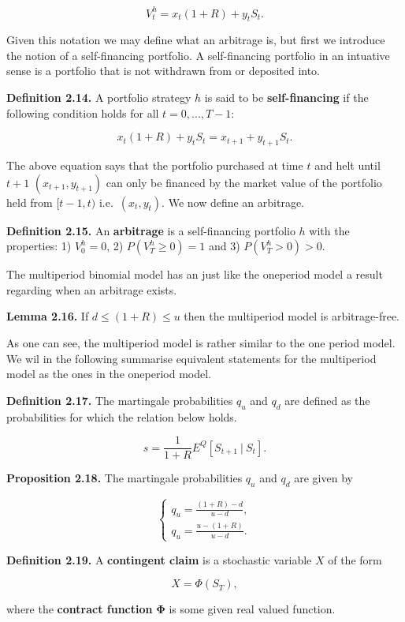 \documentclass[
]{article}
\begin{document}
\[
V_t^h=x_t(1+R)+y_tS_t.
\]

Given this notation we may define what an arbitrage is, but first we
introduce the notion of a self-financing portfolio. A self-financing
portfolio in an intuative sense is a portfolio that is not withdrawn
from or deposited into.

\textbf{Definition 2.14.} A portfolio strategy \(h\) is said to be
\textbf{self-financing} if the following condition holds for all
\(t=0,...,T-1\):

\[
x_t(1+R)+y_tS_t=x_{t+1}+y_{t+1}S_t.
\]

The above equation says that the portfolio purchased at time \(t\) and
helt until \(t+1\) \((x_{t+1},y_{t+1})\) can only be financed by the
market value of the portfolio held from \([t-1,t)\)
i.e.~\((x_{t},y_{t})\). We now define an arbitrage.

\textbf{Definition 2.15.} An \textbf{arbitrage} is a self-financing
portfolio \(h\) with the properties: 1) \(V^h_0=0\), 2)
\(P(V^h_T\ge 0)=1\) and 3) \(P(V^h_T>0)>0\).

The multiperiod binomial model has an just like the oneperiod model a
result regarding when an arbitrage exists.

\textbf{Lemma 2.16.} If \(d\le (1+R)\le u\) then the multiperiod model
is arbitrage-free.

As one can see, the multiperiod model is rather similar to the one
period model. We wil in the following summarise equivalent statements
for the multiperiod model as the ones in the oneperiod model.

\textbf{Definition 2.17.} The martingale probabilities \(q_u\) and
\(q_d\) are defined as the probabilities for which the relation below
holds.

\[
s=\frac{1}{1+R}E^Q[S_{t+1}\ \vert\ S_t].
\]

\textbf{Proposition 2.18.} The martingale probabilities \(q_u\) and
\(q_d\) are given by

\[
\left\{\begin{matrix}q_u=\frac{(1+R)-d}{u-d},\\ q_u=\frac{u-(1+R)}{u-d}.\end{matrix}\right.
\]

\textbf{Definition 2.19.} A \textbf{contingent claim} is a stochastic
variable \(X\) of the form

\[
X=\Phi(S_T),
\]

where the \textbf{contract function} \(\mathbf{\Phi}\) is some given
real valued function.
\end{document}
